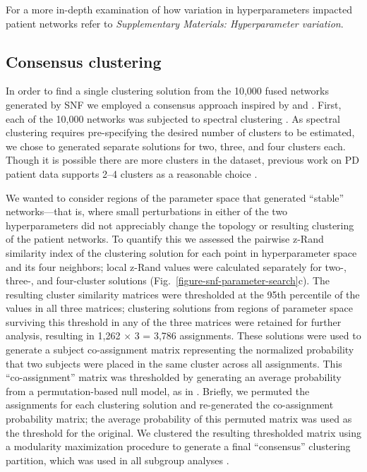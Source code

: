 \documentclass[12pt,aps,pra,reprint,showkeys]{revtex4-1}
\begin{document}
For a more in-depth examination of how variation in hyperparameters impacted patient networks refer to \textit{Supplementary Materials: Hyperparameter variation}.

\subsection*{Consensus clustering}

In order to find a single clustering solution from the 10,000 fused networks generated by SNF we employed a consensus approach inspired by \citep{bassett2013robust} and \citep{lancichinetti2012consensus}.
First, each of the 10,000 networks was subjected to spectral clustering \citep{shi2000normalized, yu2003multiclass}.
As spectral clustering requires pre-specifying the desired number of clusters to be estimated, we chose to generated separate solutions for two, three, and four clusters each.
Though it is possible there are more clusters in the dataset, previous work on PD patient data supports 2--4 clusters as a reasonable choice \citep{faghri2018predicting, fereshtehnejad2017clinical}.

We wanted to consider regions of the parameter space that generated ``stable'' networks---that is, where small perturbations in either of the two hyperparameters did not appreciably change the topology or resulting clustering of the patient networks.
To quantify this we assessed the pairwise z-Rand similarity index \citep{traud2011comparing} of the clustering solution for each point in hyperparameter space and its four neighbors; local z-Rand values were calculated separately for two-, three-, and four-cluster solutions (Fig.~\ref{figure-snf-parameter-search}c).
The resulting cluster similarity matrices were thresholded at the 95th percentile of the values in all three matrices; clustering solutions from regions of parameter space surviving this threshold in any of the three matrices were retained for further analysis, resulting in 1,262 $\times$ 3 = 3,786 assignments.
These solutions were used to generate a subject co-assignment matrix representing the normalized probability that two subjects were placed in the same cluster across all assignments.
This ``co-assignment'' matrix was thresholded by generating an average probability from a permutation-based null model, as in \citep{bassett2013robust}.
Briefly, we permuted the assignments for each clustering solution and re-generated the co-assignment probability matrix; the average probability of this permuted matrix was used as the threshold for the original.
We clustered the resulting thresholded matrix using a modularity maximization procedure to generate a final ``consensus'' clustering partition, which was used in all subgroup analyses \citep{blondel2008fast}.
\end{document}
